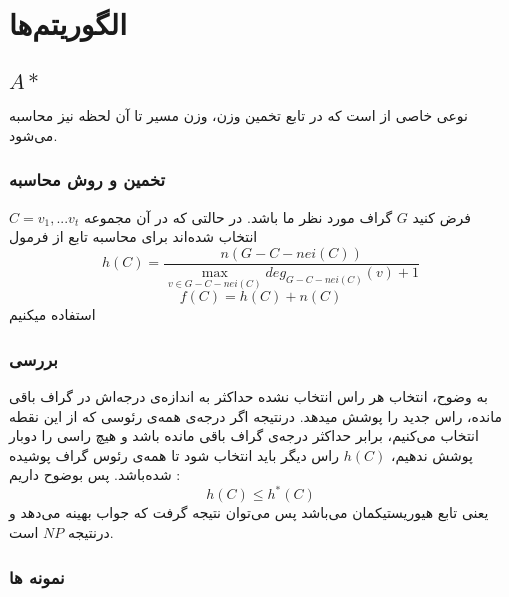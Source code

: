 \chapter{الگوریتم‌ها}
\section{$A*$}
نوعی خاصی از
است که در تابع تخمین وزن، وزن مسیر تا آن لحظه نیز محاسبه می‌شود.
\subsection{تخمین و روش محاسبه}
فرض کنید
 $G$
 گراف مورد نظر ما باشد.
 در حالتی که در آن مجموعه
 ‌$C={v_{1},... v_{t}}$
  انتخاب شده‌اند
برای محاسبه تابع 
از فرمول
\begin{equation}
\label{e01}
h(C) = \frac{n(G - C - nei(C))}{\max\limits_{v \in {G - C - nei(C)}} {deg_{G - C - nei(C)}(v) + 1}}
\end{equation}
\begin{equation}
\label{e02}
f(C) = h(C) + n(C)
\end{equation}
استفاده میکنیم
\subsection{بررسی }
به وضوح، انتخاب هر راس انتخاب نشده حداکثر به اندازه‌ی درجه‌اش در گراف باقی مانده، راس جدید را پوشش میدهد. درنتیجه اگر درجه‌ی همه‌ی رئوسی که از این نقطه انتخاب می‌کنیم، برابر حداکثر درجه‌ی گراف باقی مانده باشد و هیچ راسی را دوبار پوشش ندهیم،
$h(C)$
راس دیگر باید انتخاب شود تا همه‌ی رئوس گراف پوشیده شده‌باشد.
 پس بوضوح داریم :
\begin{equation}
\label{e03}
h(C) \leq h^*(C)
\end{equation}
یعنی تابع هیوریستیکمان 
می‌باشد پس می‌توان نتیجه گرفت که 
جواب بهینه می‌دهد و درنتیجه 
‌‌$NP$
است.

\subsection{نمونه ها}



